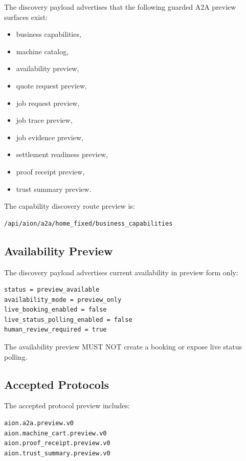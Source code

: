 The discovery payload advertises that the following guarded A2A preview surfaces exist:

\begin{itemize}
  \item business capabilities,
  \item machine catalog,
  \item availability preview,
  \item quote request preview,
  \item job request preview,
  \item job trace preview,
  \item job evidence preview,
  \item settlement readiness preview,
  \item proof receipt preview,
  \item trust summary preview.
\end{itemize}

The capability discovery route preview is:

\begin{verbatim}
/api/aion/a2a/home_fixed/business_capabilities
\end{verbatim}

\subsection{Availability Preview}

The discovery payload advertises current availability in preview form only:

\begin{verbatim}
status = preview_available
availability_mode = preview_only
live_booking_enabled = false
live_status_polling_enabled = false
human_review_required = true
\end{verbatim}

The availability preview MUST NOT create a booking or expose live status polling.

\subsection{Accepted Protocols}

The accepted protocol preview includes:

\begin{verbatim}
aion.a2a.preview.v0
aion.machine_cart.preview.v0
aion.proof_receipt.preview.v0
aion.trust_summary.preview.v0
\end{verbatim}

